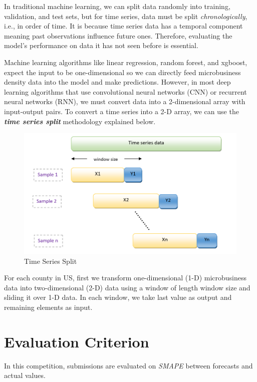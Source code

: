 \documentclass{article}
\begin{document}
\vspace{1em}
In traditional machine learning, we can split data randomly into training, validation, and test sets, but for time series, data must be split \textit{chronologically}, i.e., in order of time. It is because time series data has a temporal component meaning past observations influence future ones. Therefore, evaluating the model’s performance on data it has not seen before is essential. 

\vspace{1em}
Machine learning algorithms like linear regression, random forest, and xgboost, expect the input to be one-dimensional so we can directly feed microbusiness density data into the model and make predictions. However, in most deep learning algorithms that use convolutional neural networks (CNN) or recurrent neural networks (RNN), we must convert data into a 2-dimensional array with input-output pairs. To convert a time series into a 2-D array, we can use the \textbf{\textit{time series split}} methodology explained below.

\vspace{1em}
\begin{figure}[h]
	\centering
	\includegraphics[scale=0.6]{images/timeseriessplit}
	\caption{Time Series Split}
\end{figure}

For each county in US, first we transform one-dimensional (1-D) microbusiness data into two-dimensional (2-D) data using a window of length window size and sliding it over 1-D data. In each window, we take last value as output and remaining elements as input.

\vspace{2em}
\section{\centering Evaluation Criterion}
\vspace{1em}
In this competition, submissions are evaluated on \textit{SMAPE} between forecasts and actual values. 
\end{document}
